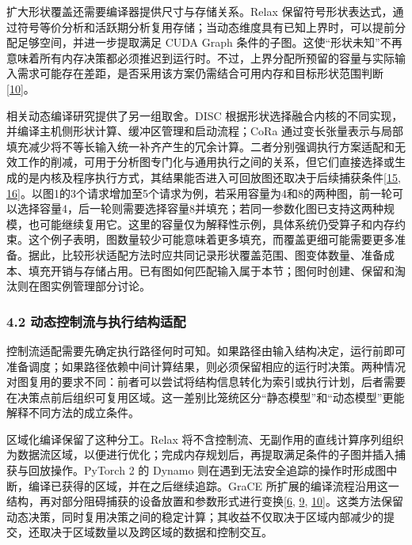 \documentclass[UTF8,11pt,fontset=windows]{ctexart}
\begin{document}
扩大形状覆盖还需要编译器提供尺寸与存储关系。Relax 保留符号形状表达式，通过符号等价分析和活跃期分析复用存储；当动态维度具有已知上界时，可以提前分配足够空间，并进一步提取满足 CUDA Graph 条件的子图。这使``形状未知''不再意味着所有内存决策都必须推迟到运行时。不过，上界分配所预留的容量与实际输入需求可能存在差距，是否采用该方案仍需结合可用内存和目标形状范围判断\protect\hyperlink{ref-10}{{[}10{]}}。

相关动态编译研究提供了另一组取舍。DISC 根据形状选择融合内核的不同实现，并编译主机侧形状计算、缓冲区管理和启动流程；CoRa 通过变长张量表示与局部填充减少将不等长输入统一补齐产生的冗余计算。二者分别强调执行方案适配和无效工作的削减，可用于分析图专门化与通用执行之间的关系，但它们直接选择或生成的是内核及程序执行方式，其结果能否进入可回放图还取决于后续捕获条件\protect\hyperlink{ref-15}{{[}15}, \protect\hyperlink{ref-16}{16{]}}。以图1的3个请求增加至5个请求为例，若采用容量为4和8的两种图，前一轮可以选择容量4，后一轮则需要选择容量8并填充；若同一参数化图已支持这两种规模，也可能继续复用它。这里的容量仅为解释性示例，具体系统仍受算子和内存约束。这个例子表明，图数量较少可能意味着更多填充，而覆盖更细可能需要更多准备。据此，比较形状适配方法时应共同记录形状覆盖范围、图变体数量、准备成本、填充开销与存储占用。已有图如何匹配输入属于本节；图何时创建、保留和淘汰则在图实例管理部分讨论。

\hypertarget{section-4-2}{%
\subsubsection{\texorpdfstring{\textbf{4.2 动态控制流与执行结构适配}}{4.2 动态控制流与执行结构适配}}\label{section-4-2}}

控制流适配需要先确定执行路径何时可知。如果路径由输入结构决定，运行前即可准备调度；如果路径依赖中间计算结果，则必须保留相应的运行时决策。两种情况对图复用的要求不同：前者可以尝试将结构信息转化为索引或执行计划，后者需要在决策点前后组织可复用区域。这一差别比笼统区分``静态模型''和``动态模型''更能解释不同方法的成立条件。

区域化编译保留了这种分工。Relax 将不含控制流、无副作用的直线计算序列组织为数据流区域，以便进行优化；完成内存规划后，再提取满足条件的子图并插入捕获与回放操作。PyTorch 2 的 Dynamo 则在遇到无法安全追踪的操作时形成图中断，编译已获得的区域，并在之后继续追踪。GraCE 所扩展的编译流程沿用这一结构，再对部分阻碍捕获的设备放置和参数形式进行变换\protect\hyperlink{ref-6}{{[}6}, \protect\hyperlink{ref-9}{9}, \protect\hyperlink{ref-10}{10{]}}。这类方法保留动态决策，同时复用决策之间的稳定计算；其收益不仅取决于区域内部减少的提交，还取决于区域数量以及跨区域的数据和控制交互。
\end{document}
